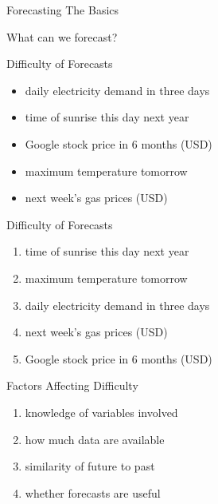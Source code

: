 \documentclass[
  ignorenonframetext,
]{beamer}
\providecommand{\tightlist}{%
  \setlength{\itemsep}{0pt}\setlength{\parskip}{0pt}}
\begin{document}
\begin{frame}{Forecasting \textbar{} \small The Basics}
\protect\hypertarget{forecasting-the-basics}{}
\centering

What can we forecast?
\end{frame}

\begin{frame}{Difficulty of Forecasts}
\protect\hypertarget{difficulty-of-forecasts}{}
\begin{itemize}
\tightlist
\item
  daily electricity demand in three days \newline
\item
  time of sunrise this day next year \newline
\item
  Google stock price in 6 months (USD) \newline
\item
  maximum temperature tomorrow \newline
\item
  next week's gas prices (USD)
\end{itemize}
\end{frame}

\begin{frame}{Difficulty of Forecasts}
\protect\hypertarget{difficulty-of-forecasts-1}{}
\begin{enumerate}
\tightlist
\item
  time of sunrise this day next year \newline
\item
  maximum temperature tomorrow \newline
\item
  daily electricity demand in three days \newline
\item
  next week's gas prices (USD) \newline
\item
  Google stock price in 6 months (USD)
\end{enumerate}
\end{frame}

\begin{frame}{Factors Affecting Difficulty}
\protect\hypertarget{factors-affecting-difficulty}{}
\begin{enumerate}
\tightlist
\item
  knowledge of variables involved \newline
\item
  how much data are available \newline
\item
  similarity of future to past \newline
\item
  whether forecasts are useful
\end{enumerate}
\end{frame}
\end{document}
